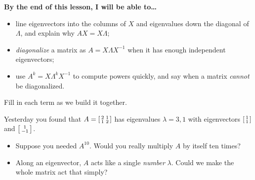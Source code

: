 \documentclass[10pt]{article}
\begin{document}
\namedateperiod

\vspace{0.12in}

\begin{objectivebox}
\textbf{By the end of this lesson, I will be able to\dots}
\begin{itemize}\setlength{\itemsep}{2pt}
  \item line eigenvectors into the columns of $X$ and eigenvalues down the diagonal of $\Lambda$, and explain why $AX=X\Lambda$;
  \item \emph{diagonalize} a matrix as $A=X\Lambda X^{-1}$ when it has enough independent eigenvectors;
  \item use $A^k=X\Lambda^k X^{-1}$ to compute powers quickly, and say when a matrix \emph{cannot} be diagonalized.
\end{itemize}
\end{objectivebox}

\vspace{0.06in}

\begin{vocabbox}
\small
Fill in each term as we build it together.
\vspace{2pt}
\end{vocabbox}

\begin{hookbox}
Yesterday you found that $A=\begin{bsmallmatrix} 2 & 1\\ 1 & 2 \end{bsmallmatrix}$ has eigenvalues
$\lambda=3,1$ with eigenvectors $\begin{bsmallmatrix}1\\1\end{bsmallmatrix}$ and $\begin{bsmallmatrix}1\\-1\end{bsmallmatrix}$.
\begin{itemize}\setlength{\itemsep}{1pt}
  \item Suppose you needed $A^{10}$. Would you really multiply $A$ by itself ten times? 
  \item Along an eigenvector, $A$ acts like a single \emph{number} $\lambda$. Could we make the whole matrix act that simply? 
\end{itemize}
\end{hookbox}
\end{document}
